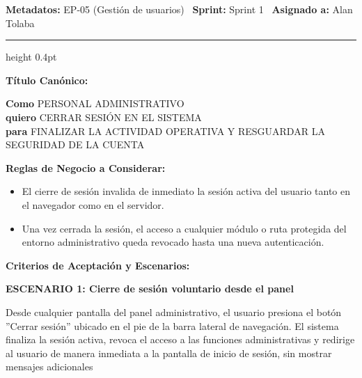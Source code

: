 \documentclass[a4paper,9pt]{article}
\begin{document}
\begin{tcolorbox}[hucard, title={\textbf{HU-54: CERRAR SESIÓN COMO ADMINISTRATIVO} \hfill \scriptsize \colorbox{slatestatus}{\textbf{\ Done\ }} \quad \colorbox{white}{\textcolor{primarydark}{\textbf{\ 2 pts\ }}}}]
\vspace{-1pt}
\noindent\textbf{\footnotesize Metadatos:} EP-05 (Gestión de usuarios) \textbar\ \textbf{Sprint:} Sprint 1 \textbar\ \textbf{Asignado a:} Alan Tolaba\par\vspace{2pt}
\hrule height 0.4pt\par\vspace{3pt}
\noindent\textbf{\footnotesize Título Canónico:}\par\vspace{1pt}
{\small \textbf{Como} PERSONAL ADMINISTRATIVO \\ \textbf{quiero} CERRAR SESIÓN EN EL SISTEMA \\ \textbf{para} FINALIZAR LA ACTIVIDAD OPERATIVA Y RESGUARDAR LA SEGURIDAD DE LA CUENTA}\par\vspace{3pt}
\noindent\textbf{\footnotesize Reglas de Negocio a Considerar:}\par\vspace{1pt}
{\footnotesize
\begin{itemize}[leftmargin=12pt, nosep, itemsep=1.5pt, topsep=1pt]
\item El cierre de sesión invalida de inmediato la sesión activa del usuario tanto en el navegador como en el servidor.
\item Una vez cerrada la sesión, el acceso a cualquier módulo o ruta protegida del entorno administrativo queda revocado hasta una nueva autenticación.
\end{itemize}
}\par\vspace{3pt}
\noindent\textbf{\footnotesize Criterios de Aceptación y Escenarios:}\par\vspace{2pt}
{\footnotesize
\noindent\textbf{\textcolor{secondarydark}{ESCENARIO 1:  Cierre de sesión voluntario desde el panel}}\par\vspace{1pt}
Desde cualquier pantalla del panel administrativo, el usuario presiona el botón ''Cerrar sesión'' ubicado en el pie de la barra lateral de navegación. El sistema finaliza la sesión activa, revoca el acceso a las funciones administrativas y redirige al usuario de manera inmediata a la pantalla de inicio de sesión, sin mostrar mensajes adicionales\par\vspace{2.5pt}
}\par
\end{tcolorbox}
\end{document}
